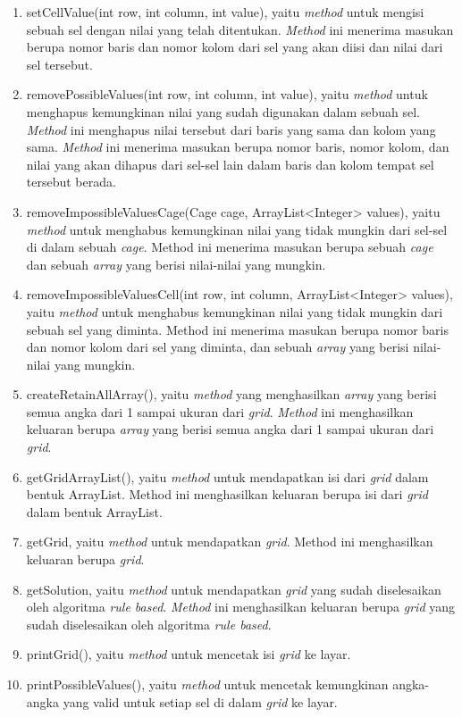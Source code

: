 \begin{enumerate}
\item setCellValue(int row, int column, int value), yaitu \textit{method} untuk mengisi sebuah sel dengan nilai yang telah ditentukan. \textit{Method} ini menerima masukan berupa nomor baris dan nomor kolom dari sel yang akan diisi dan nilai dari sel tersebut.
\item removePossibleValues(int row, int column, int value), yaitu \textit{method} untuk menghapus kemungkinan nilai yang sudah digunakan dalam sebuah sel. \textit{Method} ini menghapus nilai tersebut dari baris yang sama dan kolom yang sama. \textit{Method} ini menerima masukan berupa nomor baris, nomor kolom, dan nilai yang akan dihapus dari sel-sel lain dalam baris dan kolom tempat sel tersebut berada.
\item removeImpossibleValuesCage(Cage cage, ArrayList<Integer> values), yaitu \textit{method} untuk menghabus kemungkinan nilai yang tidak mungkin dari sel-sel di dalam sebuah \textit{cage}. Method ini menerima masukan berupa sebuah \textit{cage} dan sebuah \textit{array} yang berisi nilai-nilai yang mungkin.
\item removeImpossibleValuesCell(int row, int column, ArrayList<Integer> values), yaitu \textit{method} untuk menghabus kemungkinan nilai yang tidak mungkin dari sebuah sel yang diminta. Method ini menerima masukan berupa nomor baris dan nomor kolom dari sel yang diminta, dan sebuah \textit{array} yang berisi nilai-nilai yang mungkin.
\item createRetainAllArray(), yaitu \textit{method} yang menghasilkan \textit{array} yang berisi semua angka dari 1 sampai ukuran dari \textit{grid}. \textit{Method} ini menghasilkan keluaran berupa \textit{array} yang berisi semua angka dari 1 sampai ukuran dari \textit{grid}.
\item getGridArrayList(), yaitu \textit{method} untuk mendapatkan isi dari \textit{grid} dalam bentuk ArrayList. Method ini menghasilkan keluaran berupa isi dari \textit{grid} dalam bentuk ArrayList.
\item getGrid, yaitu \textit{method} untuk mendapatkan \textit{grid}. Method ini menghasilkan keluaran berupa \textit{grid}.
\item getSolution, yaitu \textit{method} untuk mendapatkan \textit{grid} yang sudah diselesaikan oleh algoritma \textit{rule based}. \textit{Method} ini menghasilkan keluaran berupa \textit{grid} yang sudah diselesaikan oleh algoritma \textit{rule based}.
\item printGrid(), yaitu \textit{method} untuk mencetak isi \textit{grid} ke layar.
\item printPossibleValues(), yaitu \textit{method} untuk mencetak kemungkinan angka-angka yang valid untuk setiap sel di dalam \textit{grid} ke layar.
\end{enumerate}

